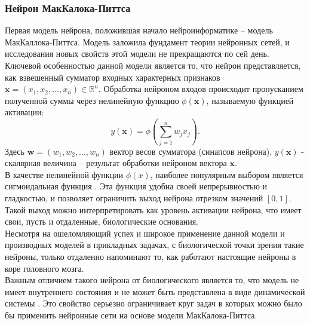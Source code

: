\documentclass[a4paper,10pt]{article}
\begin{document}
\subsubsection{Нейрон МакКалока-Питтса}
   Первая модель нейрона, положившая начало нейроинформатике -- модель МакКаллока-Питтса. Модель заложила фундамент теории нейронных сетей, и исследования новых свойств этой модели не прекращаются по сей день.\\
   \indent Ключевой особенностью данной модели является то, что нейрон представляется, как взвешенный сумматор входных характерных признаков $\boldsymbol{x}=(x_{1},x_{2},...,x_{n}) \in \mathbb{R}^n$. Обработка нейроном входов происходит пропусканием полученной суммы через нелинейную функцию $\phi(\boldsymbol{x})$, называемую функцией активации:\\
   \begin{equation*}
   y(\boldsymbol{x}) = \phi(\sum_{j=1}^{n}w_{j}x_{j}).
   \end{equation*}
Здесь $\boldsymbol{w}=(w_{1}, w_{2},...,w_{n})$ вектор весов сумматора (синапсов нейрона), $y(\boldsymbol{x})$ - скалярная величина -- результат обработки нейроном вектора $\boldsymbol{x}$.\\	
	\indent В качестве нелинейной функции $\phi(x)$, наиболее популярным выбором является сигмоидальная функция \cite{Zaencev1999}. Эта функция удобна своей непрерывностью и гладкостью, и позволяет ограничить выход нейрона  отрезком значений $[0,1]$. Такой выход можно интерпретировать как уровень активации нейрона, что имеет свои, пусть и отдаленные, биологические основания. \\
   \indent Несмотря на ошеломляющий успех и широкое применение данной модели  и производных моделей в прикладных задачах, с биологической точки зрения такие нейроны, только отдаленно напоминают то, как работают настоящие нейроны в коре головного мозга.\\
   \indent Важным отличием такого нейрона от биологического является то, что модель не имеет внутреннего состояния и не может быть представлена в виде динамической системы \cite{Zaencev1999}. Это свойство серьезно ограничивает круг задач в которых можно было бы применить нейронные сети на основе модели МакКалока-Питтса. 
\end{document}
